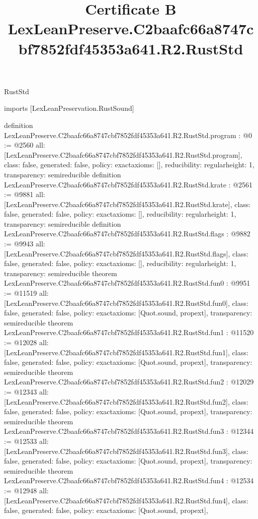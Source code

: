 \begin{lexlean}{RustStd}
\title{Certificate B LexLeanPreserve.C2baafc66a8747cbf7852fdf45353a641.R2.RustStd}
\begin{coremodule}
imports [LexLeanPreservation.RustSound]

definition LexLeanPreserve.C2baafc66a8747cbf7852fdf45353a641.R2.RustStd.program : @0 := @2560 {
  all: [LexLeanPreserve.C2baafc66a8747cbf7852fdf45353a641.R2.RustStd.program],
  class: false,
  generated: false,
  policy: exact{axioms: []},
  reducibility: regular{height: 1},
  transparency: semireducible
}
definition LexLeanPreserve.C2baafc66a8747cbf7852fdf45353a641.R2.RustStd.krate : @2561 := @9881 {
  all: [LexLeanPreserve.C2baafc66a8747cbf7852fdf45353a641.R2.RustStd.krate],
  class: false,
  generated: false,
  policy: exact{axioms: []},
  reducibility: regular{height: 1},
  transparency: semireducible
}
definition LexLeanPreserve.C2baafc66a8747cbf7852fdf45353a641.R2.RustStd.flags : @9882 := @9943 {
  all: [LexLeanPreserve.C2baafc66a8747cbf7852fdf45353a641.R2.RustStd.flags],
  class: false,
  generated: false,
  policy: exact{axioms: []},
  reducibility: regular{height: 1},
  transparency: semireducible
}
theorem LexLeanPreserve.C2baafc66a8747cbf7852fdf45353a641.R2.RustStd.fun0 : @9951 := @11519 {
  all: [LexLeanPreserve.C2baafc66a8747cbf7852fdf45353a641.R2.RustStd.fun0],
  class: false,
  generated: false,
  policy: exact{axioms: [Quot.sound, propext]},
  transparency: semireducible
}
theorem LexLeanPreserve.C2baafc66a8747cbf7852fdf45353a641.R2.RustStd.fun1 : @11520 := @12028 {
  all: [LexLeanPreserve.C2baafc66a8747cbf7852fdf45353a641.R2.RustStd.fun1],
  class: false,
  generated: false,
  policy: exact{axioms: [Quot.sound, propext]},
  transparency: semireducible
}
theorem LexLeanPreserve.C2baafc66a8747cbf7852fdf45353a641.R2.RustStd.fun2 : @12029 := @12343 {
  all: [LexLeanPreserve.C2baafc66a8747cbf7852fdf45353a641.R2.RustStd.fun2],
  class: false,
  generated: false,
  policy: exact{axioms: [Quot.sound, propext]},
  transparency: semireducible
}
theorem LexLeanPreserve.C2baafc66a8747cbf7852fdf45353a641.R2.RustStd.fun3 : @12344 := @12533 {
  all: [LexLeanPreserve.C2baafc66a8747cbf7852fdf45353a641.R2.RustStd.fun3],
  class: false,
  generated: false,
  policy: exact{axioms: [Quot.sound, propext]},
  transparency: semireducible
}
theorem LexLeanPreserve.C2baafc66a8747cbf7852fdf45353a641.R2.RustStd.fun4 : @12534 := @12948 {
  all: [LexLeanPreserve.C2baafc66a8747cbf7852fdf45353a641.R2.RustStd.fun4],
  class: false,
  generated: false,
  policy: exact{axioms: [Quot.sound, propext]},
}
\end{coremodule}
\end{lexlean}
